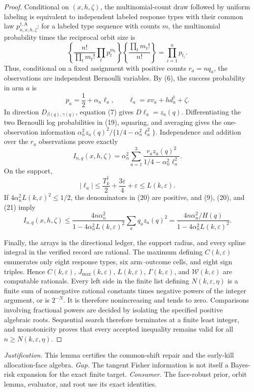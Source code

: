 \documentclass{article}
\begin{document}
{\begin{proof}
Conditional on \((x,h,\zeta)\), the multinomial-count draw followed by uniform
labeling is equivalent to independent labeled response types with their common law
\(p_{n,x,h,\zeta}^{\dagger,\mathrm A}\): for a labeled type sequence with counts
\(m\), the multinomial probability times the reciprocal orbit size is
\[
 \left\{\frac{n!}{\prod_tm_t!}\prod_t p_t^{m_t}\right\}
 \left\{\frac{\prod_tm_t!}{n!}\right\}
 =\prod_{i=1}^np_{t_i}.
\tag{18}
\]
Thus, conditional on a fixed assignment with positive counts \(r_a=nq_a\), the
observations are independent Bernoulli variables.  By (6), the success probability
in arm \(a\) is
\[
 p_a=\frac12+\alpha_n\ell_a,
 \qquad
 \ell_a=xv_a+hd_a^\dagger+\zeta.
\tag{19}
\]
In direction \(D_{\beta(q),\gamma(q)}\), equation (7) gives
\(D\ell_a=z_a(q)\).  Differentiating the two Bernoulli log probabilities in
(19), squaring, and averaging gives the one-observation information
\(\alpha_n^2z_a(q)^2/\{1/4-\alpha_n^2\ell_a^2\}\).  Independence and addition
over the \(r_a\) observations prove exactly
\[
 I_{n,q}(x,h,\zeta)
 =\alpha_n^2\sum_{a=1}^3
 \frac{r_az_a(q)^2}{1/4-\alpha_n^2\ell_a^2}.
\tag{20}
\]
On the support,
\[
 |\ell_a|\le \frac{T_k^\dagger}{2}+\frac{3\varepsilon}{4}
 +\varepsilon\le L(k,\varepsilon).
\tag{21}
\]
If \(4\alpha_n^2L(k,\varepsilon)^2\le1/2\), the denominators in (20) are
positive, and (9), (20), and (21) imply
\[
 I_{n,q}(x,h,\zeta)
 \le\frac{4n\alpha_n^2}{1-4\alpha_n^2L(k,\varepsilon)^2}
 \sum_aq_az_a(q)^2
 =\frac{4n\alpha_n^2/H(q)}
 {1-4\alpha_n^2L(k,\varepsilon)^2}.
\tag{22}
\]

Finally, the arrays in the directional ledger, the support radius, and every spline
integral in the verified record are rational.  The maximum defining
\(C(k,\varepsilon)\) enumerates only eight response types, six arm--outcome cells,
and eight sign triples.  Hence \(C(k,\varepsilon)\),
\(J_{\max}(k,\varepsilon)\), \(L(k,\varepsilon)\),
\(\Gamma(k,\varepsilon)\), and \(\mathcal W(k,\varepsilon)\) are computable
rationals.  Every left side in the finite list defining
\(N(k,\varepsilon,\eta)\) is a finite sum of nonnegative rational constants times
negative powers of the integer argument, or is \(2^{-N}\).  It is therefore
nonincreasing and tends to zero.  Comparisons involving fractional powers are
decided by isolating the specified positive algebraic roots.  Sequential search
therefore terminates at a finite least integer, and monotonicity proves that every
accepted inequality remains valid for all \(n\ge N(k,\varepsilon,\eta)\).
\end{proof}
\par\smallskip\noindent \textit{Justification.} This lemma certifies the common-shift repair and the early-kill allocation-face algebra. \textit{Gap.} The tangent Fisher information is not itself a Bayes-risk expansion for the exact finite target. \textit{Consumer.} The face-robust prior, orbit lemma, evaluator, and root use its exact identities.

}
\end{document}
